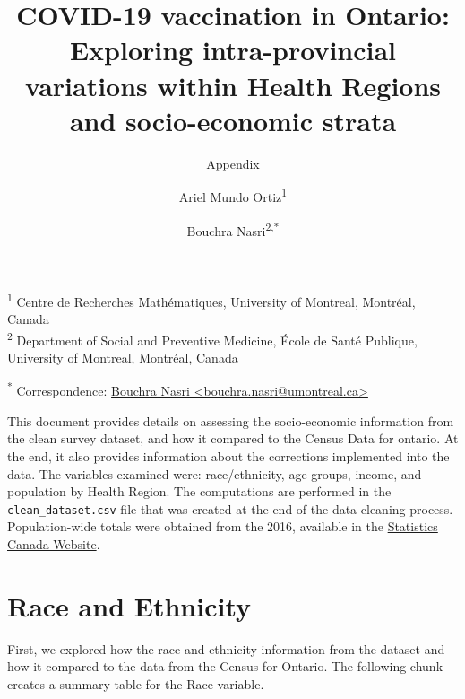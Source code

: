\documentclass[
  letterpaper,
  DIV=11,
  numbers=noendperiod]{scrartcl}
\title{\textbf{COVID-19 vaccination in Ontario: Exploring
intra-provincial variations within Health Regions and socio-economic
strata}}
\subtitle{Appendix}
\author{Ariel Mundo Ortiz\textsuperscript{1} \and Bouchra
Nasri\textsuperscript{2,*}}
\date{}
\begin{document}
\maketitle
\setcounter{page}{1}
\renewcommand\thesection{A}
\renewcommand\thesubsection{\thesection.\arabic{subsection}}
\renewcommand{\thepage}{A-\arabic{page}}
\renewcommand{\thetable}{A-\arabic{table}}
\renewcommand\thefigure{\thesection-\arabic{figure}}


\ifdefined\Shaded\renewenvironment{Shaded}{\begin{tcolorbox}[borderline west={3pt}{0pt}{shadecolor}, interior hidden, sharp corners, boxrule=0pt, breakable, enhanced, frame hidden]}{\end{tcolorbox}}\fi

\textsuperscript{1} Centre de Recherches Mathématiques, University of
Montreal, Montréal, Canada\\
\textsuperscript{2} Department of Social and Preventive Medicine, École
de Santé Publique, University of Montreal, Montréal, Canada

\textsuperscript{*} Correspondence:
\href{mailto:bouchra.nasri@umontreal.ca}{Bouchra Nasri
\textless{}bouchra.nasri@umontreal.ca\textgreater{}}

This document provides details on assessing the socio-economic
information from the clean survey dataset, and how it compared to the
Census Data for ontario. At the end, it also provides information about
the corrections implemented into the data. The variables examined were:
race/ethnicity, age groups, income, and population by Health Region. The
computations are performed in the \texttt{clean\_dataset.csv} file that
was created at the end of the data cleaning process. Population-wide
totals were obtained from the 2016, available in the
\href{https://www12.statcan.gc.ca/census-recensement/2016/dp-pd/prof/details/Page.cfm?Lang=E\&Geo1=PR\&Code1=35\&Geo2=\&Code2=\&Data=Count\&SearchText=Ontario\&Sear}{Statistics
Canada Website}.

\hypertarget{race-and-ethnicity}{%
\section{Race and Ethnicity}\label{race-and-ethnicity}}

First, we explored how the race and ethnicity information from the
dataset and how it compared to the data from the Census for Ontario. The
following chunk creates a summary table for the Race variable.
\end{document}
